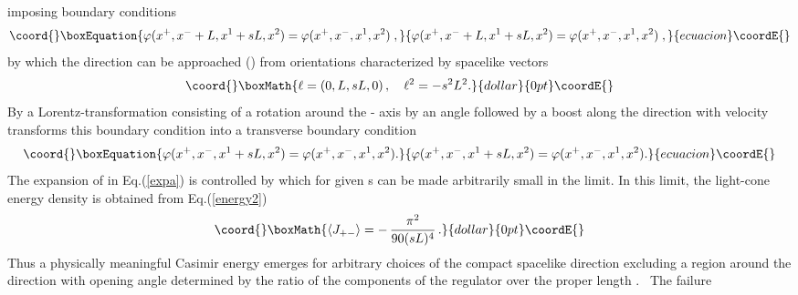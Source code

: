 \documentclass[a4paper,twocolumn,eqsecnum,aps]{revtex4}
\begin{document}
 imposing   boundary conditions  
\begin{equation}\coord{}\boxEquation{
  \label{bcp}
  \varphi(x^+,x^-+L,x^1+sL,x^2)= \varphi(x^+,x^-,x^1,x^2) \;,
}{
  \varphi(x^+,x^-+L,x^1+sL,x^2)= \varphi(x^+,x^-,x^1,x^2) \;,
}{ecuacion}\coordE{}\end{equation}
by which the \coordHE{} direction can be approached (\coordHE{}) from orientations characterized by spacelike vectors
$$\coord{}\boxMath{\ell = (0,L,sL,0)\, ,\quad \ell^{2} = -s^2 L^2 . }{dollar}{0pt}\coordE{}$$
By a Lorentz-transformation consisting of a rotation around the \coordHE{} - axis by an angle \coordHE{} followed by a boost along the \coordHE{} direction with velocity \myHighlight{$\beta =\sin \alpha$}\coordHE{} transforms this boundary condition into  a transverse boundary condition
\begin{equation}\coord{}\boxEquation{
  \label{bcpp}
  \varphi(x^+,x^-,x^1+sL,x^2)= \varphi(x^+,x^-,x^1,x^2) .
}{
  \varphi(x^+,x^-,x^1+sL,x^2)= \varphi(x^+,x^-,x^1,x^2) .
}{ecuacion}\coordE{}\end{equation}
The expansion of \coordHE{} in Eq.(\ref{expa}) is controlled by  \coordHE{} which for given s can be made arbitrarily small in the \coordHE{} limit. In this limit,   
the light-cone energy density is obtained from Eq.(\ref{energy2})
$$\coord{}\boxMath{ \langle J_{+-}\rangle = - \,\frac{\pi^2}{90 (sL)^4}\, .}{dollar}{0pt}\coordE{}$$
Thus a physically meaningful  Casimir energy emerges for arbitrary choices of the compact spacelike direction excluding  a  region around the \coordHE{} direction with opening angle determined by the ratio of the components of the regulator \coordHE{} over the proper length \coordHE{}. 
\vskip 0.2cm
\,  The failure   
\end{document}
